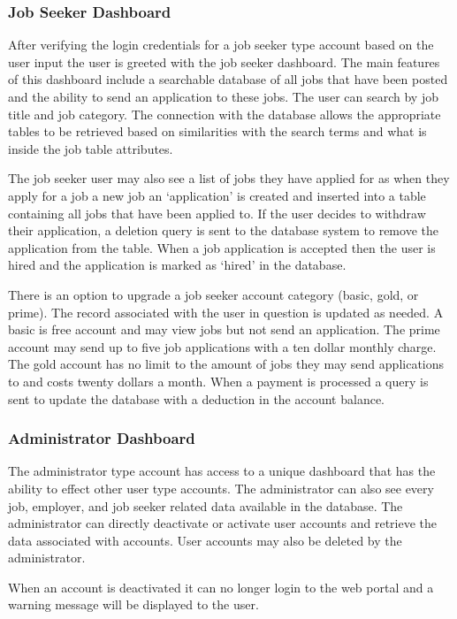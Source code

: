 \documentclass[11pt]{article}
\begin{document}
\subsubsection{Job Seeker Dashboard}

After verifying the login credentials for a job seeker type account based on the user input the user is greeted with the job seeker dashboard. The main features of this dashboard include a searchable database of all jobs that have been posted and the ability to send an application to these jobs. The user can search by job title and job category. The connection with the database allows the appropriate tables to be retrieved based on similarities with the search terms and what is inside the job table attributes. \par 
The job seeker user may also see a list of jobs they have applied for as when they apply for a job a new job an `application' is created and inserted into a table containing all jobs that have been applied to. If the user decides to withdraw their application, a deletion query is sent to the database system to remove the application from the table. When a job application is accepted then the user is hired and the application is marked as `hired' in the database. \par 
There is an option to upgrade a job seeker account category (basic, gold, or prime). The record associated with the user in question is updated as needed. A basic is free account and may view jobs but not send an application. The prime account may send up to five job applications with a ten dollar monthly charge. The gold account has no limit to the amount of jobs they may send applications to and costs twenty dollars a month. When a payment is processed a query is sent to update the database with a deduction in the account balance.

\subsubsection{Administrator Dashboard}

The administrator type account has access to a unique dashboard that has the ability to effect other user type accounts. The administrator can also see every job, employer, and job seeker related data available in the database. The administrator can directly deactivate or activate user accounts and retrieve the data associated with accounts. User accounts may also be deleted by the administrator. \par
	When an account is deactivated it can no longer login to the web portal and a warning message will be displayed to the user.
\end{document}

